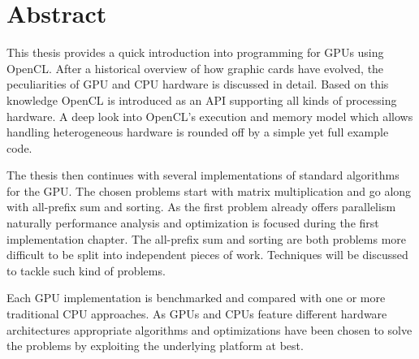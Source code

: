 \section*{Abstract}

This thesis provides a quick introduction into programming for GPUs using OpenCL. After a historical overview of how graphic cards have evolved, the peculiarities of GPU and CPU hardware is discussed in detail. Based on this knowledge OpenCL is introduced as an API supporting all kinds of processing hardware. A deep look into OpenCL's execution and memory model which allows handling heterogeneous hardware is rounded off by a simple yet full example code.

The thesis then continues with several implementations of standard algorithms for the GPU. The chosen problems start with matrix multiplication and go along with all-prefix sum and sorting. As the first problem already offers parallelism naturally performance analysis and optimization is focused during the first implementation chapter. The all-prefix sum and sorting are both problems more difficult to be split into independent pieces of work. Techniques will be discussed to tackle such kind of problems.

Each GPU implementation is benchmarked and compared with one or more traditional CPU approaches. As GPUs and CPUs feature different hardware architectures appropriate algorithms and optimizations have been chosen to solve the problems by exploiting the underlying platform at best.
